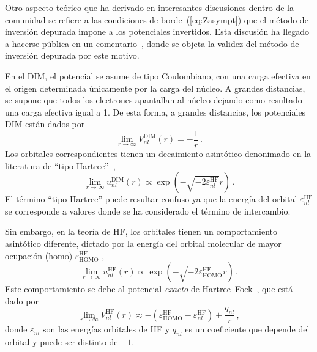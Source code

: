 Otro aspecto teórico que ha derivado en interesantes discusiones dentro 
de la comunidad se refiere a las condiciones de borde~(\ref{eq:Zasympt}) 
que el método de inversión depurada impone a los potenciales invertidos. 
Esta discusión ha llegado a hacerse pública en un 
comentario~\cite{Cinal:19}, donde se objeta la validez del método de 
inversión depurada por este motivo.

En el DIM, el potencial se asume de tipo Coulombiano, con una carga 
efectiva en el origen determinada únicamente por la carga del núcleo. A 
grandes distancias, se supone que todos los electrones apantallan al 
núcleo dejando como resultado una carga efectiva igual a 1. De esta 
forma, a grandes distancias, los potenciales DIM están dados por
\begin{equation}
\lim_{r\rightarrow\infty} V_{nl}^{\mathrm{DIM}}(r) = -\frac{1}{r}\,.
\label{eq:VDIMasympt}
\end{equation}
Los orbitales correspondientes tienen un decaimiento asintótico 
denonimado en la literatura de ``tipo Hartree''~\cite{Casida:89},
\begin{equation}
\lim_{r \rightarrow \infty} u_{nl}^{\mathrm{DIM}}(r) \propto
\exp(- \sqrt{- 2 \varepsilon_{nl}^{\mathrm{HF}} } r ) \,.
\label{eq:uDIMasympt}
\end{equation}
El término ``tipo-Hartree'' puede resultar confuso ya que la energía 
del orbital $\varepsilon_{nl}^{\mathrm{HF}}$ se corresponde a valores 
donde se ha considerado el término de intercambio. 

Sin embargo, en la teoría de HF, los orbitales tienen un comportamiento 
asintótico diferente, dictado por la energía del orbital molecular de 
mayor ocupación (\acs{homo}) $\varepsilon_{\mathrm{HOMO}}^{\mathrm{HF}}$ 
\cite{Handy:69,Handler:80,Ishida:92},
\begin{equation}
\lim_{r \rightarrow \infty} u_{nl}^{\mathrm{HF}}(r) \propto
\exp(- \sqrt{- 2 \varepsilon_{\mathrm{HOMO}}^{\mathrm{HF}} } r )  \, .
\label{eq:uHFasympt}
\end{equation}
Este comportamiento se debe al potencial \textit{exacto} de 
Hartree--Fock~\cite{Cinal:10}, que está dado por
\begin{equation}
\lim_{r\rightarrow\infty} V_{nl}^{\mathrm{HF}}(r) \approx
-\left(\varepsilon_{\mathrm{HOMO}}^{\mathrm{HF}}
-\varepsilon_{nl}^{\mathrm{HF}}\right)+\frac{q_{nl}}{r}\,,
\label{eq:VHFasympt}
\end{equation}
donde $\varepsilon_{nl}$ son las energías orbitales de HF y $q_{nl}$ es 
un coeficiente que depende del orbital y puede ser distinto de $-1$.

